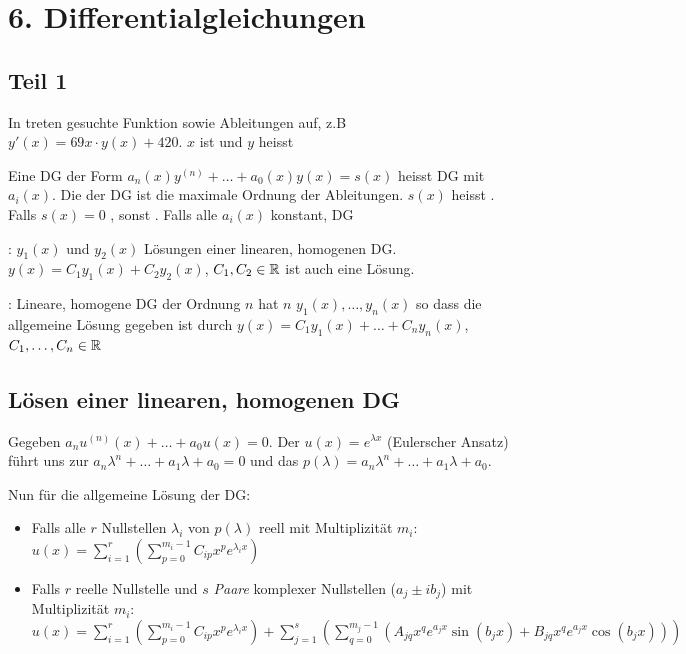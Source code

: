 \section{6. Differentialgleichungen}

\subsection{Teil 1}

\Def In  treten gesuchte Funktion sowie Ableitungen auf,
z.B $y'(x) = 69x \cdot y(x) + 420$. $x$ ist  und $y$ heisst

\Def Eine DG der Form
$a_n(x)y^{(n)} + \ldots + a_0(x)y(x) = s(x)$
heisst  DG mit  $a_i(x)$. Die  der DG ist
die maximale Ordnung der Ableitungen. $s(x)$ heisst . Falls $s(x) = 0$
, sonst .
Falls alle $a_i(x)$ konstant, DG 

\Satz {}: $y_1(x)$ und $y_2(x)$ Lösungen einer linearen, homogenen DG.
$y(x) = C_1 y_1(x) + C_2 y_2(x)$, $C_1, C_2 \in \mathbb{R}$ ist auch eine Lösung.

\Satz {}: Lineare, homogene DG der Ordnung $n$ hat $n$
 $y_1(x), \ldots, y_n(x)$ so dass die allgemeine Lösung gegeben ist durch
$y(x) = C_1 y_1(x) + \ldots + C_n y_n(x)$, $C_1, \ldots, C_n \in \mathbb{R}$

\subsection{Lösen einer linearen, homogenen DG}

Gegeben $a_n u^{(n)}(x) + \ldots + a_0 u(x) = 0$. Der  $u(x) = e^{\lambda x}$
(Eulerscher Ansatz) führt uns zur 
$a_n \lambda^n + \ldots + a_1 \lambda + a_0 = 0$ und das 
$p(\lambda) = a_n \lambda^n + \ldots + a_1 \lambda + a_0$.

Nun für die allgemeine Lösung der DG:
\vspace{-0.6em}
\begin{itemize}
    \item Falls alle $r$ Nullstellen $\lambda_i$ von $p(\lambda)$ reell mit Multiplizität $m_i$:
    $u(x) = \sum_{i=1}^{r} \left(\sum_{p=0}^{m_i-1} C_{ip}x^pe^{\lambda_i x}\right)$
    \item Falls $r$ reelle Nullstelle und $s$ \textit{Paare} komplexer Nullstellen ($a_j \pm ib_j$)
    mit Multiplizität $m_i$:
    $u(x) = \sum_{i=1}^{r}\left(\sum_{p=0}^{m_i - 1}C_{ip} x^p e^{\lambda_i x}\right) + \sum_{j=1}^{s} \left(\sum_{q=0}^{m_j-1}(A_{jq} x^q e^{a_j x} \sin(b_j x) + B_{jq} x^q e^{a_j x} \cos(b_j x))\right)$
\end{itemize}

